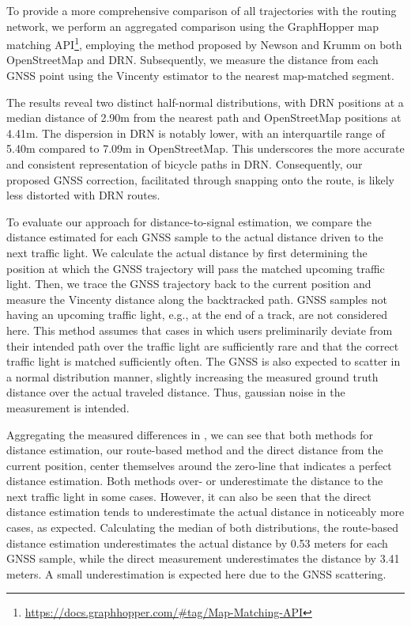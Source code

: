To provide a more comprehensive comparison of all trajectories with the routing network, we perform an aggregated comparison using the GraphHopper map matching API\footnote{\url{https://docs.graphhopper.com/\#tag/Map-Matching-API}}, employing the method proposed by Newson and Krumm \cite{newson_hidden_2009} on both OpenStreetMap and DRN. Subsequently, we measure the distance from each GNSS point using the Vincenty estimator to the nearest map-matched segment.

The results reveal two distinct half-normal distributions, with DRN positions at a median distance of 2.90m from the nearest path and OpenStreetMap positions at 4.41m. The dispersion in DRN is notably lower, with an interquartile range of 5.40m compared to 7.09m in OpenStreetMap. This underscores the more accurate and consistent representation of bicycle paths in DRN. Consequently, our proposed GNSS correction, facilitated through snapping onto the route, is likely less distorted with DRN routes.

To evaluate our approach for distance-to-signal estimation, we compare the distance estimated for each GNSS sample to the actual distance driven to the next traffic light. We calculate the actual distance by first determining the position at which the GNSS trajectory will pass the matched upcoming traffic light. Then, we trace the GNSS trajectory back to the current position and measure the Vincenty distance along the backtracked path. GNSS samples not having an upcoming traffic light, e.g., at the end of a track, are not considered here. This method assumes that cases in which users preliminarily deviate from their intended path over the traffic light are sufficiently rare and that the correct traffic light is matched sufficiently often. The GNSS is also expected to scatter in a normal distribution manner, slightly increasing the measured ground truth distance over the actual traveled distance. Thus, gaussian noise in the measurement is intended.

Aggregating the measured differences in , we can see that both methods for distance estimation, our route-based method and the direct distance from the current position, center themselves around the zero-line that indicates a perfect distance estimation. Both methods over- or underestimate the distance to the next traffic light in some cases. However, it can also be seen that the direct distance estimation tends to underestimate the actual distance in noticeably more cases, as expected. Calculating the median of both distributions, the route-based distance estimation underestimates the actual distance by 0.53 meters for each GNSS sample, while the direct measurement underestimates the distance by 3.41 meters. A small underestimation is expected here due to the GNSS scattering.

